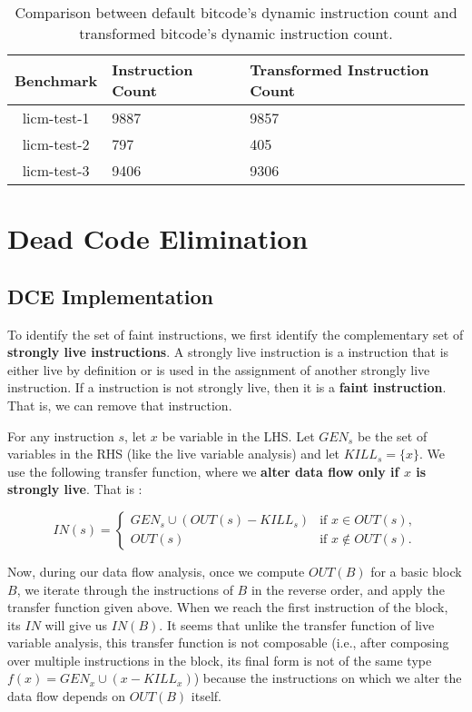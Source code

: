 \begin{table}[!ht]
\centering
\begin{tabular}{c|l|l}
  \toprule
  \textbf{Benchmark} & \textbf{Instruction Count} & \textbf{Transformed Instruction Count} \\
  \midrule
  licm-test-1 & 9887 & 9857 \\ 
  licm-test-2 & 797  & 405 \\
  licm-test-3 & 9406 & 9306 \\ 
  \bottomrule
\end{tabular}
\caption{Comparison between default bitcode's dynamic instruction count and transformed
  bitcode's dynamic instruction count.}
\end{table}  


\section{Dead Code Elimination}

\subsection{DCE Implementation}

To identify the set of faint instructions, we first identify the complementary set of \textbf{strongly live instructions}.
A strongly live instruction is a instruction that is either live by definition or is used in the assignment of another
strongly live instruction.
If a instruction is not strongly live, then it is a \textbf{faint instruction}.
That is, we can remove that instruction.

For any instruction $s$, let $x$ be variable in the LHS. Let $GEN_s$ be the set of variables in the RHS (like the live variable analysis) and
let $KILL_s = \{x\}$. We use the following transfer function, where we \textbf{alter data flow only if $x$ is strongly live}. That is :

\[
IN(s) = \left\{ 
\begin{array}{ll}
GEN_s \cup (OUT(s)-KILL_s) & \mbox{if } x \in OUT(s),\\
OUT(s) & \mbox{if } x \notin OUT(s).
\end{array}
\right.
\]

Now, during our data flow analysis, once we compute $OUT(B)$ for a basic block $B$, we iterate through the instructions of $B$ in the reverse order, and apply the transfer function given above. When we reach the first instruction of the block, its $IN$ will give us $IN(B)$. It seems that unlike the transfer function of live variable analysis, this transfer function is not composable (i.e., after composing over multiple instructions in the block, its final form is not of the same type $f(x) = GEN_x \cup (x-KILL_x)$) because the instructions on which we alter the data flow depends on $OUT(B)$ itself.\\  

